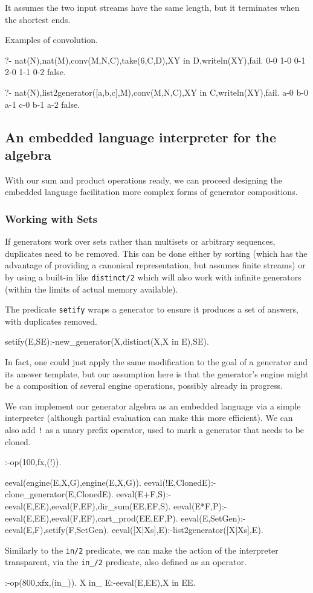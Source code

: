 \documentclass{new_tlp}
\begin{document}
It assumes the two input streams have the same length, but it terminates
when the shortest ends. 

\BX
Examples of convolution.
\begin{codex}
?- nat(N),nat(M),conv(M,N,C),take(6,C,D),XY in D,writeln(XY),fail.
0-0
1-0
0-1
2-0
1-1
0-2
false.

?- nat(N),list2generator([a,b,c],M),conv(M,N,C),XY in C,writeln(XY),fail.
a-0
b-0
a-1
c-0
b-1
a-2
false.
\end{codex}
\EX

\subsection{An embedded language interpreter for the algebra}

With our sum and product operations ready, we can proceed designing the embedded language
facilitation more complex forms of generator compositions.

\subsubsection{Working with Sets}

If generators work over sets rather than multisets or arbitrary sequences,
duplicates need to be removed. This can be done either by sorting (which has the advantage
of providing a canonical representation, but assumes finite streams) or by using  a built-in like {\tt distinct/2} which will also work with infinite generators (within the limits of actual memory available).

The predicate {\tt setify} wraps a generator to ensure it produces a set of answers, with duplicates removed.
\begin{code}
setify(E,SE):-new_generator(X,distinct(X,X in E),SE).
\end{code}
In fact, one could just apply the same modification to the goal of a generator and its answer template, but our assumption here is that the generator's engine might be a composition of several engine operations, possibly already in progress.

We can implement our generator algebra as an embedded language via a simple interpreter
(although partial evaluation can make this more efficient). We can also add {\tt !} as a unary prefix operator, used to mark a generator that needs to be cloned.

\begin{code}
:-op(100,fx,(!)).

eeval(engine(E,X,G),engine(E,X,G)).
eeval(!E,ClonedE):-clone_generator(E,ClonedE).
eeval(E+F,S):-eeval(E,EE),eeval(F,EF),dir_sum(EE,EF,S).
eeval(E*F,P):-eeval(E,EE),eeval(F,EF),cart_prod(EE,EF,P).
eeval({E},SetGen):-eeval(E,F),setify(F,SetGen).
eeval([X|Xs],E):-list2generator([X|Xs],E).
\end{code}
Similarly to the {\tt in/2} predicate, we can make the action of the
interpreter transparent, via the {\tt in\_/2} predicate, also defined as an operator.
\begin{code}
:-op(800,xfx,(in_)).
X in_ E:-eeval(E,EE),X in EE.     
\end{code}
\end{document}

